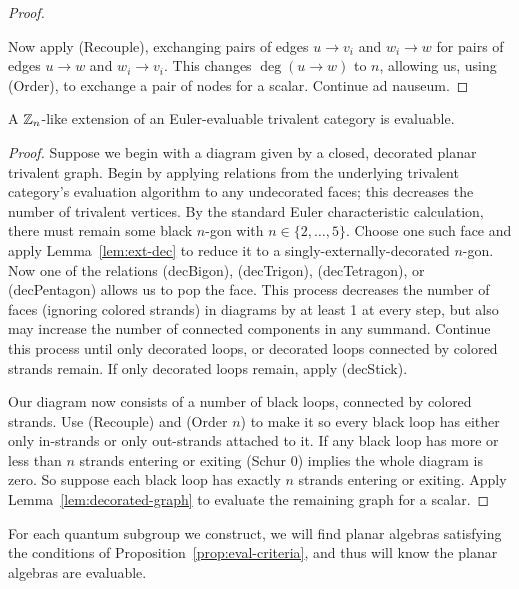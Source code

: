 \begin{proof}
\begin{center}
    \end{center}

    Now apply (Recouple), exchanging pairs of edges $u\to v_i$ and $w_i \to w$ for pairs of edges $u\to w$ and $w_i\to v_i$.
    This changes $\deg(u\to w)$ to $n$, allowing us, using (Order), to exchange a pair of nodes for a scalar.
    Continue ad nauseum.
\end{proof}







\begin{proposition}\label{prop:eval-criteria}
    A $\mathbb{Z}_n$-like extension of an Euler-evaluable trivalent category is evaluable.
\end{proposition}

\begin{proof}
    Suppose we begin with a diagram given by a closed, decorated planar trivalent graph.
    Begin by applying relations from the underlying trivalent category's evaluation algorithm to any undecorated faces; 
    this decreases the number of trivalent vertices.
    By the standard Euler characteristic calculation, there must remain some black $n$-gon with $n\in\{ 2,\dots,5 \}$.
    Choose one such face and apply Lemma~\ref{lem:ext-dec} to reduce it to a singly-externally-decorated $n$-gon.
    Now one of the relations (decBigon), (decTrigon), (decTetragon), or (decPentagon) allows us to pop the face.
    This process decreases the number of faces (ignoring colored strands) in diagrams by at least 1 at every step,
    but also may increase the number of connected components in any summand.
    Continue this process until only decorated loops, or decorated loops connected by colored strands remain.
    If only decorated loops remain, apply (decStick).
    
    Our diagram now consists of a number of black loops, connected by colored strands.
    Use (Recouple) and (Order $n$) to make it so every black loop has either only in-strands or only out-strands attached to it.
    If any black loop has more or less than $n$ strands entering or exiting (Schur 0) implies the whole diagram is zero.
    So suppose each black loop has exactly $n$ strands entering or exiting.
    Apply Lemma~\ref{lem:decorated-graph} to evaluate the remaining graph for a scalar.
\end{proof}

For each quantum subgroup we construct, we will find planar algebras satisfying the conditions of Proposition~\ref{prop:eval-criteria}, and thus will know the planar algebras are evaluable. 



